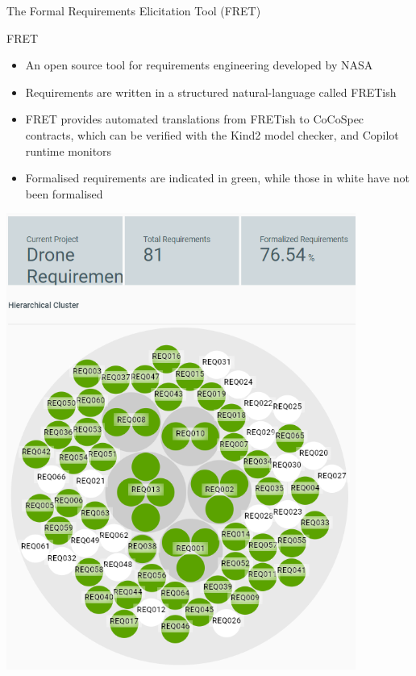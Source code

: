 \documentclass[11pt, aspectratio=169, table]{beamer}
\begin{document}
\begin{frame}{The Formal Requirements Elicitation Tool (FRET)}
\begin{minipage}{0.55\textwidth}
	\begin{block}{FRET}
		\begin{itemize}
			\item An open source tool for requirements engineering developed by NASA
			
			\item Requirements are written in a structured natural-language called FRETish
			
			\item FRET provides automated translations from FRETish to CoCoSpec contracts, which can be verified with the Kind2 model checker, and Copilot runtime monitors

                \item Formalised requirements are indicated in green, while those in white have not been formalised

		\end{itemize}
	\end{block}
\end{minipage}\noindent
\begin{minipage}{0.43\textwidth}
	\centering
	\includegraphics[width=0.86\textwidth]{images/drone-reqs-circle-diagram-no-legend.png}
\end{minipage}
\end{frame}
\end{document}
